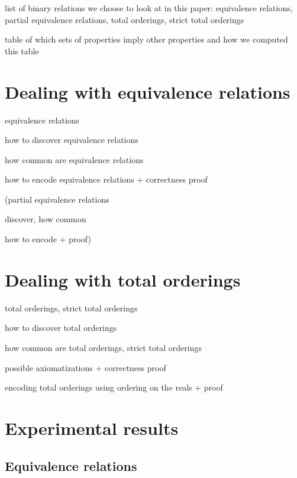 \documentclass{easychair}
\begin{document}
list of binary relations we choose to look at in this paper: equivalence relations, partial equivalence relations, total orderings, strict total orderings

table of which sets of properties imply other properties and how we computed this table


\section{Dealing with equivalence relations}

equivalence relations

how to discover equivalence relations

how common are equivalence relations

how to encode equivalence relations + correctness proof

(partial equivalence relations

discover, how common

how to encode + proof)


\section{Dealing with total orderings}

total orderings, strict total orderings

how to discover total orderings

how common are total orderings, strict total orderings

possible axiomatizations + correctness proof

encoding total orderings using ordering on the reals + proof


\section{Experimental results}

\subsection{Equivalence relations}
\end{document}
